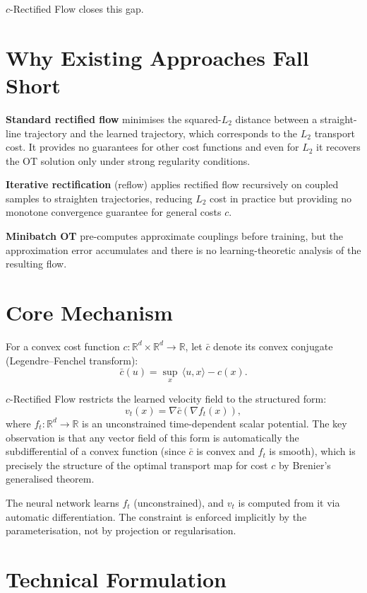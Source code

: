 \documentclass[10pt,twocolumn]{article}
\begin{document}
$c$-Rectified Flow closes this gap.

\section{Why Existing Approaches Fall Short}

\textbf{Standard rectified flow} minimises the squared-$L_2$ distance between a
straight-line trajectory and the learned trajectory, which corresponds to the
$L_2$ transport cost. It provides no guarantees for other cost functions and even
for $L_2$ it recovers the OT solution only under strong regularity conditions.

\textbf{Iterative rectification} (reflow) applies rectified flow recursively on
coupled samples to straighten trajectories, reducing $L_2$ cost in practice but
providing no monotone convergence guarantee for general costs $c$.

\textbf{Minibatch OT} pre-computes approximate couplings before training, but the
approximation error accumulates and there is no learning-theoretic analysis of
the resulting flow.

\section{Core Mechanism}

For a convex cost function $c: \mathbb{R}^d \times \mathbb{R}^d \to \mathbb{R}$,
let $\bar{c}$ denote its convex conjugate (Legendre--Fenchel transform):
\[
\bar{c}(u) = \sup_{x}\, \langle u, x \rangle - c(x).
\]

$c$-Rectified Flow restricts the learned velocity field to the structured form:
\[
v_t(x) = \nabla\bar{c}\!\left(\nabla f_t(x)\right),
\]
where $f_t: \mathbb{R}^d \to \mathbb{R}$ is an unconstrained time-dependent
scalar potential. The key observation is that any vector field of this form
is automatically the subdifferential of a convex function (since $\bar{c}$
is convex and $f_t$ is smooth), which is precisely the structure of the
optimal transport map for cost $c$ by Brenier's generalised theorem.

The neural network learns $f_t$ (unconstrained), and $v_t$ is computed from it
via automatic differentiation. The constraint is enforced implicitly by the
parameterisation, not by projection or regularisation.

\section{Technical Formulation}
\end{document}
